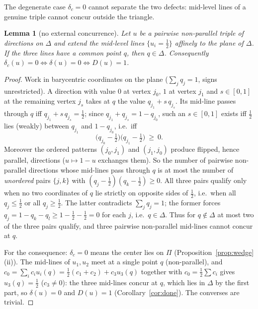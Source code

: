\documentclass[11pt,reqno]{amsart}
\theoremstyle{plain}
\newtheorem{lemma}[theorem]{Lemma}
\theoremstyle{definition}
\theoremstyle{remark}
\begin{document}
The degenerate case $\delta_c=0$ cannot separate the two defects:
mid-level lines of a genuine triple cannot concur outside the triangle.

\begin{lemma}[no external concurrence]\label{lem:external}
Let $u$ be a pairwise non-parallel triple of directions on $\Delta$ and extend
the mid-level lines $\{u_i=\tfrac12\}$ affinely to the plane of $\Delta$. If
the three lines have a common point $q$, then $q\in\Delta$. Consequently
$\delta_c(u)=0\iff\delta(u)=0\iff D(u)=1$.
\end{lemma}

\begin{proof}
Work in barycentric coordinates on the plane ($\sum_jq_j=1$, signs
unrestricted). A direction with value $0$ at vertex $j_0$, $1$ at vertex
$j_1$ and $s\in[0,1]$ at the remaining vertex $j_s$ takes at $q$ the value
$q_{j_1}+s\,q_{j_s}$. Its mid-line passes through $q$ iff
$q_{j_1}+s\,q_{j_s}=\tfrac12$; since $q_{j_1}+q_{j_s}=1-q_{j_0}$, such an
$s\in[0,1]$ exists iff $\tfrac12$ lies (weakly) between $q_{j_1}$ and
$1-q_{j_0}$, i.e.\ iff
\[
\bigl(q_{j_0}-\tfrac12\bigr)\bigl(q_{j_1}-\tfrac12\bigr)\ \ge\ 0 .
\]
Moreover the ordered patterns $(j_0,j_1)$ and $(j_1,j_0)$ produce flipped,
hence parallel, directions ($u\mapsto1-u$ exchanges them). So the number of
pairwise non-parallel directions whose mid-lines pass through $q$ is at most
the number of \emph{unordered} pairs $\{j,k\}$ with
$(q_j-\tfrac12)(q_k-\tfrac12)\ge0$. All three pairs qualify only when no two
coordinates of $q$ lie strictly on opposite sides of $\tfrac12$, i.e.\ when
all $q_j\le\tfrac12$ or all $q_j\ge\tfrac12$. The latter contradicts
$\sum_jq_j=1$; the former forces
$q_j=1-q_k-q_l\ge1-\tfrac12-\tfrac12=0$ for each $j$, i.e.\ $q\in\Delta$.
Thus for $q\notin\Delta$ at most two of the three pairs qualify, and three
pairwise non-parallel mid-lines cannot concur at $q$.

For the consequence: $\delta_c=0$ means the center lies on $\Pi$
(Proposition~\ref{prop:wedge}(ii)). The mid-lines of $u_1,u_2$ meet at a
single point $q$ (non-parallel), and
$c_0=\sum_ic_iu_i(q)=\tfrac12(c_1+c_2)+c_3u_3(q)$ together with
$c_0=\tfrac12\sum c_i$ gives $u_3(q)=\tfrac12$ ($c_3\ne0$): the three
mid-lines concur at $q$, which lies in $\Delta$ by the first part, so
$\delta(u)=0$ and $D(u)=1$ (Corollary~\ref{cor:done}). The converses are
trivial.
\end{proof}
\end{document}
